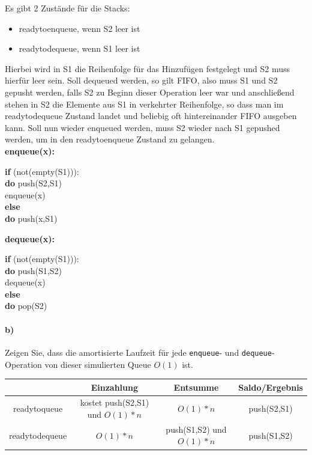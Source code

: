 \documentclass[paper=a4, fontsize=11pt]{scrartcl}
\numberwithin{equation}{section}
\numberwithin{figure}{section}
\numberwithin{table}{section}
\begin{document}
Es gibt 2 Zustände für die Stacks: 
\begin{itemize}
\item readytoenqueue, wenn S2 leer ist
\item readytodequeue, wenn S1 leer ist
\end{itemize}

Hierbei wird in S1 die Reihenfolge für das Hinzufügen festgelegt und S2 muss hierfür leer sein. Soll dequeued werden, so gilt FIFO, also muss S1 und S2 gepusht werden, falls S2 zu Beginn dieser Operation leer war und anschließend stehen in S2 die Elemente aus S1 in verkehrter Reihenfolge, so dass man im readytodequeue Zustand landet und beliebig oft hintereinander FIFO ausgeben kann. Soll nun wieder enqueued werden, muss S2 wieder nach S1 gepushed werden, um in den readytoenqueue Zustand zu gelangen. \\

\textbf{enqueue(x):} \\
\begin{algorithm}[H]
\SetAlgoLined
\textbf{if} (not(empty(S1))): \\
\textbf{do} push(S2,S1) \\
enqueue(x)\\
\textbf{else} \\
\textbf{do} push(x,S1)
\end{algorithm}

\textbf{dequeue(x):} \\
\begin{algorithm}[H]
\SetAlgoLined
\textbf{if} (not(empty(S1))): \\
\textbf{do} push(S1,S2) \\
dequeue(x) \\
\textbf{else} \\
\textbf{do} pop(S2)
\end{algorithm}


\paragraph{b)} 
Zeigen Sie, dass die amortisierte Laufzeit für jede \texttt{enqueue}- und
\texttt{dequeue}-Operation von dieser simulierten Queue $O(1)$ ist. \\

\begin{tabular}{c|c|c|c}
& Einzahlung & Entsumme & Saldo/Ergebnis \\\hline
readytoqueue & kostet push(S2,S1) und $O(1)*n$ & $O(1)*n$ & push(S2,S1) \\\hline
readytodequeue & $O(1)*n$ & push(S1,S2) und $O(1)*n$ & push(S1,S2)
\end{tabular}
\end{document}
